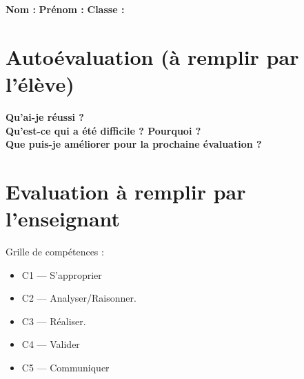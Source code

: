 \documentclass[11pt,a4paper]{article}
\begin{document}
\begin{tcolorbox}[colback=white,colframe=black,title=Évaluation test %
]
\textbf{Nom :} \hspace{4cm}
\textbf{Prénom :} \hspace{4cm}
\textbf{Classe :}
\end{tcolorbox}

\section*{Autoévaluation (à remplir par l’élève)}
\begin{tcolorbox}[colback=white,colframe=black]
\textbf{Qu’ai-je réussi ?}\\[1cm]
\textbf{Qu’est-ce qui a été difficile ? Pourquoi ?}\\[1.5cm]
\textbf{Que puis-je améliorer pour la prochaine évaluation ?}\\[1.5cm]
\end{tcolorbox}

\section*{Evaluation à remplir par l'enseignant}
\begin{tcolorbox}[colback=white,colframe=black]
Grille de compétences :
\begin{itemize}
    \item C1 — S’approprier
    \item C2 — Analyser/Raisonner.
    \item C3 — Réaliser.
    \item C4 — Valider
    \item C5 — Communiquer
\end{itemize}
\end{tcolorbox}
\end{document}
